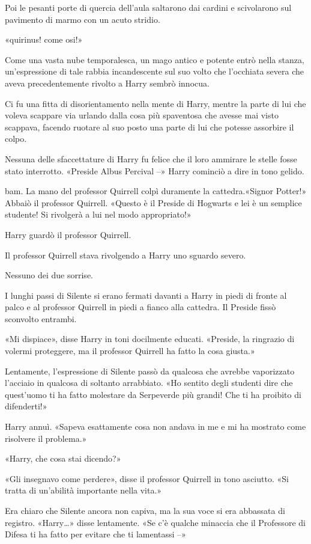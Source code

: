 Poi le pesanti porte di quercia dell’aula saltarono dai cardini e scivolarono sul pavimento di marmo con un acuto stridio.

«quirinus! come osi!»

Come una vasta nube temporalesca, un mago antico e potente entrò nella stanza, un’espressione di tale rabbia incandescente sul suo volto che l’occhiata severa che aveva precedentemente rivolto a Harry sembrò innocua.

Ci fu una fitta di disorientamento nella mente di Harry, mentre la parte di lui che voleva scappare via urlando dalla cosa più spaventosa che avesse mai visto scappava, facendo ruotare al suo posto una parte di lui che potesse assorbire il colpo.

Nessuna delle sfaccettature di Harry fu felice che il loro ammirare le stelle fosse stato interrotto. «Preside Albus Percival –» Harry cominciò a dire in tono gelido.

bam. La mano del professor Quirrell colpì duramente la cattedra.«Signor Potter!» Abbaiò il professor Quirrell. «Questo è il Preside di Hogwarts e lei è un semplice studente! Si rivolgerà a lui nel modo appropriato!»

Harry guardò il professor Quirrell.

Il professor Quirrell stava rivolgendo a Harry uno sguardo severo.

Nessuno dei due sorrise.

I lunghi passi di Silente si erano fermati davanti a Harry in piedi di fronte al palco e al professor Quirrell in piedi a fianco alla cattedra. Il Preside fissò sconvolto entrambi.

«Mi dispiace», disse Harry in toni docilmente educati. «Preside, la ringrazio di volermi proteggere, ma il professor Quirrell ha fatto la cosa giusta.»

Lentamente, l’espressione di Silente passò da qualcosa che avrebbe vaporizzato l’acciaio in qualcosa di soltanto arrabbiato. «Ho sentito degli studenti dire che quest’uomo ti ha fatto molestare da Serpeverde più grandi! Che ti ha proibito di difenderti!»

Harry annuì. «Sapeva esattamente cosa non andava in me e mi ha mostrato come risolvere il problema.»

«Harry, che cosa stai dicendo?»

«Gli insegnavo come perdere», disse il professor Quirrell in tono asciutto. «Si tratta di un’abilità importante nella vita.»

Era chiaro che Silente ancora non capiva, ma la sua voce si era abbassata di registro. «Harry…» disse lentamente. «Se c’è qualche minaccia che il Professore di Difesa ti ha fatto per evitare che ti lamentassi –»


